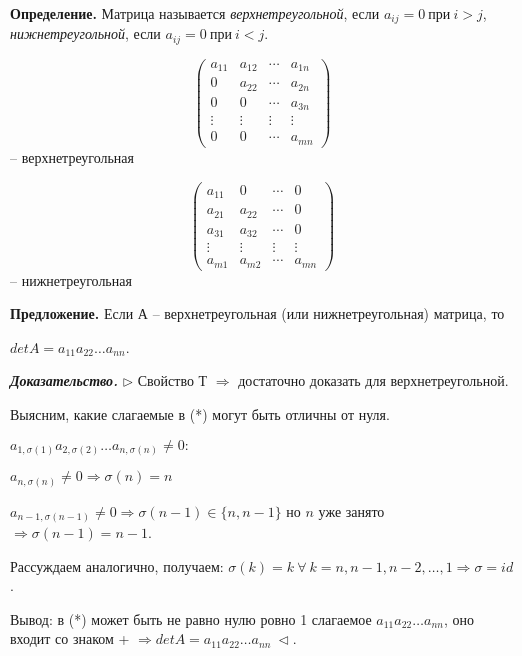 \vspace{\baselineskip}
\textbf{Определение.} Матрица называется \textit{верхнетреугольной}, если $a_{ij} = 0 \ при \ i > j$, \textit{нижнетреугольной}, если $a_{ij} = 0 \ при \ i < j$. 

\[\begin{pmatrix}
		a_{11} & a_{12} & \cdots & a_{1n} \\
		0 & a_{22} & \cdots & a_{2n} \\
        0 & 0 & \cdots & a_{3n} \\
       \vdots & \vdots & \vdots& \vdots \\ 
       0 & 0 & \cdots & a_{mn}
	\end{pmatrix}
\] -- верхнетреугольная 

\[\begin{pmatrix}
		a_{11} & 0 & \cdots & 0 \\
		a_{21} & a_{22} & \cdots & 0 \\
        a_{31} & a_{32} & \cdots & 0 \\
       \vdots & \vdots & \vdots& \vdots \\ 
       a_{m1} & a_{m2} & \cdots & a_{mn}
	\end{pmatrix}
\] -- нижнетреугольная 

\vspace{\baselineskip}
\textbf{Предложение.} Если А -- верхнетреугольная (или нижнетреугольная) матрица, то 

$detA = a_{11} a_{22} \dots a_{nn}$.

\vspace{\baselineskip}
\textbf{\textit{Доказательство.}} $\rhd$ Свойство Т $\Rightarrow$ достаточно доказать для верхнетреугольной.

Выясним, какие слагаемые в (*) могут быть отличны от нуля.

$a_{1, \sigma(1)} a_{2, \sigma(2)} \dots a_{n, \sigma(n)} \neq 0:$

$a_{n, \sigma(n)} \neq 0 \Rightarrow \sigma (n) = n$

$a_{n-1, \sigma(n - 1)} \neq 0 \Rightarrow \sigma (n - 1) \in \{n, n - 1 \}$ но $n$ уже занято $\Rightarrow \sigma (n - 1) = n - 1$.

Рассуждаем аналогично, получаем: $\sigma (k) = k \ \forall \ k = n, n-1, n-2, \dots, 1 \Rightarrow \sigma = id$.

Вывод: в (*) может быть не равно нулю ровно 1 слагаемое $a_{11} a_{22} \dots a_{nn}$, оно входит со знаком + $\Rightarrow detA  = a_{11} a_{22} \dots a_{nn} \ \lhd$.

